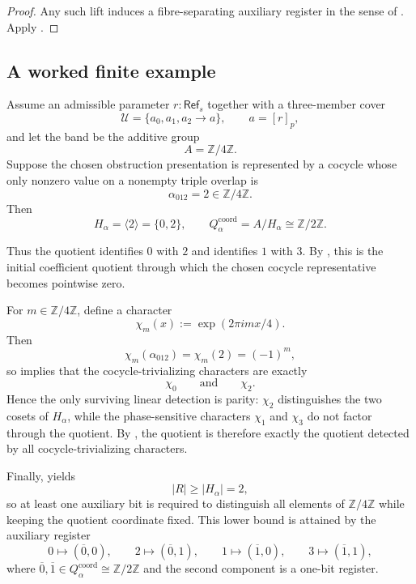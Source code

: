 \begin{proof}
Any such lift induces a fibre-separating auxiliary register in the sense of . Apply .
\end{proof}

\subsection{A worked finite example}

\begin{example}\label{ex:one-bit-hidden-obstruction}
Assume an admissible parameter $r:\mathsf{Ref}_s$ together with a three-member cover
\[
\mathcal U=\{a_0,a_1,a_2\to a\},
\qquad
a=[r]_p,
\]
and let the band be the additive group
\[
A=\mathbb Z/4\mathbb Z.
\]
Suppose the chosen obstruction presentation is represented by a cocycle whose only nonzero value on a nonempty triple overlap is
\[
\alpha_{012}=2\in \mathbb Z/4\mathbb Z.
\]
Then
\[
H_\alpha=\langle 2\rangle=\{0,2\},
\qquad
Q_{\alpha}^{\mathrm{coord}}=A/H_\alpha\cong \mathbb Z/2\mathbb Z.
\]

Thus the quotient identifies $0$ with $2$ and identifies $1$ with $3$. By , this is the initial coefficient quotient through which the chosen cocycle representative becomes pointwise zero.

For $m\in\mathbb Z/4\mathbb Z$, define a character
\[
\chi_m(x):=\exp(2\pi i mx/4).
\]
Then
\[
\chi_m(\alpha_{012})=\chi_m(2)=(-1)^m,
\]
so  implies that the cocycle-trivializing characters are exactly
\[
\chi_0
\qquad\text{and}\qquad
\chi_2.
\]
Hence the only surviving linear detection is parity: $\chi_2$ distinguishes the two cosets of $H_\alpha$, while the phase-sensitive characters $\chi_1$ and $\chi_3$ do not factor through the quotient. By , the quotient is therefore exactly the quotient detected by all cocycle-trivializing characters.

Finally,  yields
\[
|R|\ge |H_\alpha|=2,
\]
so at least one auxiliary bit is required to distinguish all elements of $\mathbb Z/4\mathbb Z$ while keeping the quotient coordinate fixed. This lower bound is attained by the auxiliary register
\[
0\mapsto (\overline{0},0),\qquad
2\mapsto (\overline{0},1),\qquad
1\mapsto (\overline{1},0),\qquad
3\mapsto (\overline{1},1),
\]
where $\overline{0},\overline{1}\in Q_{\alpha}^{\mathrm{coord}}\cong \mathbb Z/2\mathbb Z$ and the second component is a one-bit register.
\end{example}
